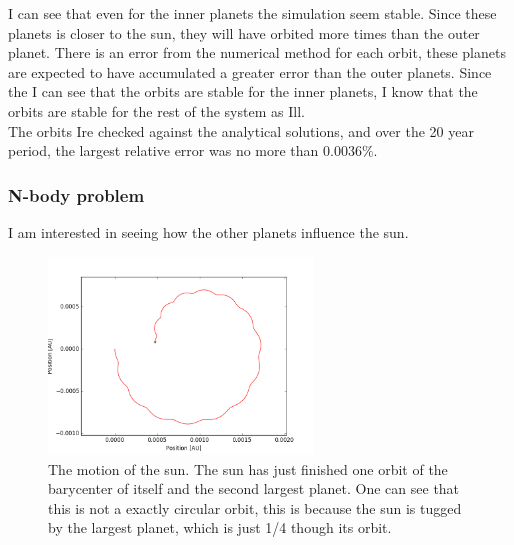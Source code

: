 \documentclass[a4paper, 10pt]{article}
\begin{document}
I can see that even for the inner planets the simulation seem stable. Since these planets is closer to the sun, they will have orbited more times than the outer planet. There is an error from the numerical method for each orbit, these planets are expected to have accumulated a greater error than the outer planets. Since the I can see that the orbits are stable for the inner planets, I know that the orbits are stable for the rest of the system as Ill.\\

The orbits Ire checked against the analytical solutions, and over the 20 year period, the largest relative error was no more than $0.0036\%$.


\subsubsection{N-body problem}
I am interested in seeing how the other planets influence the sun.

\begin{figure}[H]
\begin{center}
\includegraphics[width = 70mm]{part2posSun.png}
\caption{The motion of the sun. The sun has just finished one orbit of the barycenter of itself and the second largest planet. One can see that this is not a exactly circular orbit, this is because the sun is tugged by the largest planet, which is just 1/4 though its orbit.}
\end{center}
\end{figure}
\end{document}
